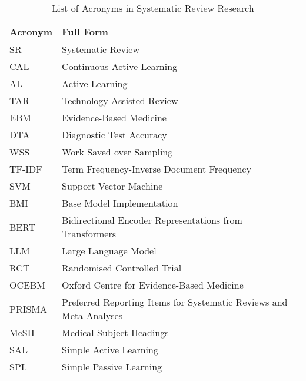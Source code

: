 \documentclass[../main.tex]{subfiles}
\begin{document}
\begin{table*}[t]
\centering
\begin{tabular}{|l|l|}
\hline
\textbf{Acronym} & \textbf{Full Form} \\
\hline
SR & Systematic Review \\
CAL & Continuous Active Learning \\
AL & Active Learning \\
TAR & Technology-Assisted Review \\
EBM & Evidence-Based Medicine \\
DTA & Diagnostic Test Accuracy \\
WSS & Work Saved over Sampling \\
TF-IDF & Term Frequency-Inverse Document Frequency \\
SVM & Support Vector Machine \\
BMI & Base Model Implementation \\
BERT & Bidirectional Encoder Representations from Transformers \\
LLM & Large Language Model \\
RCT & Randomised Controlled Trial \\
OCEBM & Oxford Centre for Evidence-Based Medicine \\
PRISMA & Preferred Reporting Items for Systematic Reviews and Meta-Analyses \\
MeSH & Medical Subject Headings \\
SAL & Simple Active Learning \\
SPL & Simple Passive Learning \\
\hline
\end{tabular}
\caption{List of Acronyms in Systematic Review Research}
\label{tab:acronyms}
\end{table*}
\end{document}
